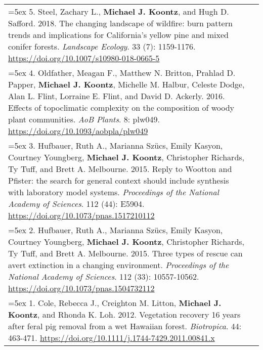 \begin{longtable}{@{} >{\raggedright}p{6.10in} >{\raggedleft}X @{}}
\hangindent=5ex 5. Steel, Zachary L., \textbf{Michael J. Koontz}, and Hugh D. Safford. 2018. The changing landscape of wildfire: burn pattern trends and implications for California's yellow pine and mixed conifer forests. \emph{Landscape Ecology}. 33 (7): 1159-1176. \href{https://doi.org/10.1007/s10980-018-0665-5}{https://doi.org/10.1007/s10980-018-0665-5} &  \tabularnewline

\hangindent=5ex 4. Oldfather, Meagan F., Matthew N. Britton, Prahlad D. Papper, \textbf{Michael J. Koontz}, Michelle M. Halbur, Celeste Dodge, Alan L. Flint, Lorraine E. Flint, and David D. Ackerly. 2016. Effects of topoclimatic complexity on the composition of woody plant communities. \emph{AoB Plants}. 8: plw049. \href{https://doi.org/10.1093/aobpla/plw049}{https://doi.org/10.1093/aobpla/plw049} & \tabularnewline

\hangindent=5ex 3. Hufbauer, Ruth A., Marianna Sz\"ucs, Emily Kasyon, Courtney Youngberg, \textbf{Michael J. Koontz}, Christopher Richards, Ty Tuff, and Brett A. Melbourne. 2015. Reply to Wootton and Pfister: the search for general context should include synthesis with laboratory model systems. \emph{Proceedings of the National Academy of Sciences}. 112 (44): E5904. \href{https://doi.org/10.1073/pnas.1517210112}{https://doi.org/10.1073/pnas.1517210112} & \tabularnewline

\hangindent=5ex 2. Hufbauer, Ruth A., Marianna Sz\"ucs, Emily Kasyon, Courtney Youngberg, \textbf{Michael J. Koontz}, Christopher Richards, Ty Tuff, and Brett A. Melbourne. 2015. Three types of rescue can avert extinction in a changing environment. \emph{Proceedings of the National Academy of Sciences}. 112 (33): 10557-10562. \href{https://doi.org/10.1073/pnas.1504732112}{https://doi.org/10.1073/pnas.1504732112} &  \tabularnewline

\hangindent=5ex 1. Cole, Rebecca J., Creighton M. Litton, \textbf{Michael J. Koontz}, and Rhonda K. Loh. 2012. Vegetation recovery 16 years after feral pig removal from a wet Hawaiian forest. \emph{Biotropica}. 44: 463-471. \href{https://doi.org/10.1111/j.1744-7429.2011.00841.x}{https://doi.org/10.1111/j.1744-7429.2011.00841.x} &  \tabularnewline

\end{longtable}